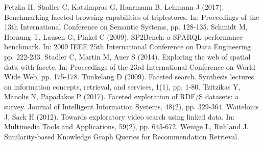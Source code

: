 \begin{thebibliography}{99}
 Petzka H, Stadler C, Katsimpras G, Haarmann B, Lehmann J (2017). Benchmarking faceted browsing capabilities of triplestores. In: Proceedings of the 13th International Conference on Semantic Systems, pp. 128-135.
 Schmidt M, Hornung T, Lausen G, Pinkel C (2009). SP2Bench: a SPARQL performance benchmark. In: 2009 IEEE 25th International Conference on Data Engineering pp. 222-233. 
 Stadler C, Martin M, Auer S (2014). Exploring the web of spatial data with facete. In: Proceedings of the 23rd International Conference on World Wide Web, pp. 175-178.
 Tunkelang D (2009). Faceted search. Synthesis lectures on information concepts, retrieval, and services, 1(1), pp. 1-80.
 Tzitzikas Y, Manolis N, Papadakos P (2017). Faceted exploration of RDF/S datasets: a survey. Journal of Intelligent Information Systems, 48(2), pp. 329-364.
 Waitelonis J, Sack H (2012). Towards exploratory video search using linked data. In: Multimedia Tools and Applications, 59(2), pp. 645-672.
 Wenige L, Ruhland J. Similarity-based Knowledge Graph Queries for Recommendation Retrieval. 
\end{thebibliography}


